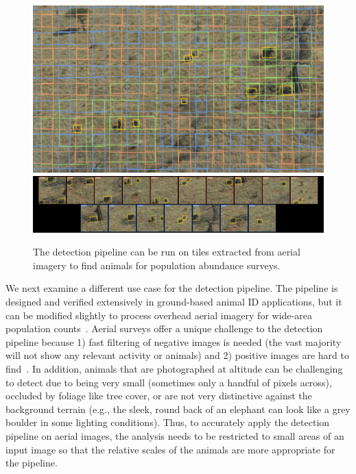 \begin{figure}[!t]
    \begin{center}
        \includegraphics[width=0.90\linewidth]{resources/mws-tiles1.pdf} \\
        \includegraphics[width=0.90\linewidth]{resources/mws-tiles2.pdf}
    \end{center}
    \caption{The detection pipeline can be run on tiles extracted from aerial imagery to find animals for population abundance surveys.}
    \label{fig:mws-tiles}
\end{figure}

We next examine a different use case for the detection pipeline.  The pipeline is designed and verified extensively in ground-based animal ID applications, but it can be modified slightly to process overhead aerial imagery for wide-area population counts~\cite{caughley_sampling_1977,jachmann_comparison_2002,melville_aerial_2008}.  Aerial surveys offer a unique challenge to the detection pipeline because 1) fast filtering of negative images is needed (the vast majority will not show any relevant activity or animals) and 2) positive images are hard to find~\cite{graham_investigating_1989}. In addition, animals that are photographed at altitude can be challenging to detect due to being very small (sometimes only a handful of pixels across), occluded by foliage like tree cover, or are not very distinctive against the background terrain (e.g., the sleek, round back of an elephant can look like a grey boulder in some lighting conditions). Thus, to accurately apply the detection pipeline on aerial images, the analysis needs to be restricted to small areas of an input image so that the relative scales of the animals are more appropriate for the pipeline.

